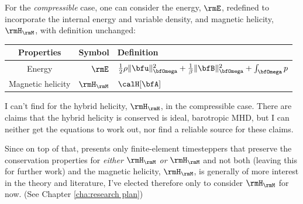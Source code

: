     For the \emph{compressible} case, one can consider the energy, $\rmE$, redefined to incorporate the internal energy and variable density, and magnetic helicity, $\rmH_{\rmM}$, with definition unchanged:
    \begin{center}\begin{tabular}{ c | r : l }
        Properties  &  Symbol  &  Definition  \\
        \hline\hline
        Energy  &  $\rmE$  &  $\frac{1}{2}\rho\|\bfu\|_{\bfOmega}^{2} + \frac{1}{\beta}\|\bfB\|_{\bfOmega}^{2} + \int_{\bfOmega}p$  \\
        \hdashline
        Magnetic helicity \cite{Blackman_2015}  &  $\rmH_{\rmM}$  &  $\calH[\bfA]$
    \end{tabular}\end{center}

    \begin{remark}
        I can't find for the hybrid helicity, $\rmH_{\rmH}$, in the compressible case. There are claims that the hybrid helicity is conserved is ideal, barotropic MHD, but I can neither get the equations to work out, nor find a reliable source for these claims.
        
        Since on top of that, \cite{Laakmann_Hu_Farrell_2022} presents only finite-element timesteppers that preserve the conservation properties for \emph{either} $\rmH_{\rmM}$ \emph{or} $\rmH_{\rmM}$ and not both (leaving this for further work) and the magnetic helicity, $\rmH_{\rmM}$, is generally of more interest in the theory and literature, I've elected therefore only to consider $\rmH_{\rmM}$ for now. (See Chapter \ref{cha:research plan})
    \end{remark}

